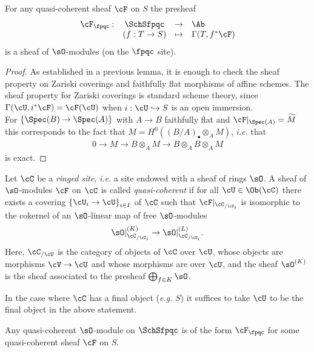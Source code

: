 \begin{prop} For any quasi-coherent sheaf $\cF$ on $S$ the presheaf
$$
\begin{array}{rccl}
\cF_\fpqc : & \SchSfpqc & \to & \Ab\\ 
& (f: T \to S) &\mapsto & \Gamma(T, f^*\cF)
\end{array}
$$
  is a sheaf of $\sO$-modules (on the $\fpqc$ site). 
\end{prop}
\begin{proof}
  As established in a previous lemma, it is enough to check the sheaf property on Zariski coverings and faithfully flat morphisms of affine schemes.  The sheaf property for Zariski coverings is standard scheme theory, since $\Gamma(\cU, i^\ast \cF) = \cF(\cU)$ when $i: \cU \hookrightarrow S$ is an open immersion. 
  \\
  For $\left\{\Spec(B)\to \Spec(A)\right\}$ with $A\to B$ faithfully
  flat and 
  $\cF|_{\Spec(A)} = \widetilde{M}$ 
  this corresponds to the fact that
  $M=H^0\left((B/A)_\bullet\otimes_AM \right)$, {\it i.e.} that
  \begin{align*}
0 \to M \to B\otimes_A M \to B\otimes_A B \otimes_A M
\end{align*}
is exact.
\end{proof}

  \begin{defi}
    Let $\cC$ be a \emph{ringed site}, {\it i.e.} a site endowed with a sheaf of rings $\sO$. A sheaf of $\sO$-modules $\cF$ on $\cC$ is called \emph{quasi-coherent} if for all $\cU\in \Ob(\cC)$ there exists a covering $\left\{\cU_i \to \cU\right\}_{i\in I}$ of $\cC$ such that  $\cF|_{\cC_{/\cU_i}}$ is isomorphic to the cokernel of an $\sO$-linear map of free $\sO$-modules $$\sO|_{\cC_{/\cU_i}}^{(K)} \to \sO|_{\cC_{/\cU_i}}^{(L)}.$$ Here, $\cC_{/\cU}$ is the category of objects of $\cC$ over $\cU$, whose objects are morphisms $\cV \to \cU$ and whose morphisms are over $\cU$, and the sheaf $\sO^{(K)}$ is the sheaf associated to the presheaf $\bigoplus_{f \in K} \sO$. 
  \end{defi}
  
  \begin{remark}
  In the case where $\cC$ has a final object ({\it e.g.} $S$) it suffices to take $\cU$ to be the final object in the above statement.
  \end{remark}
  
  \begin{thm}
Any quasi-coherent $\sO$-module on $\SchSfpqc$ is of the form $\cF_\fpqc$ for some quasi-coherent sheaf $\cF$ on $S$. 
  \end{thm}
  
